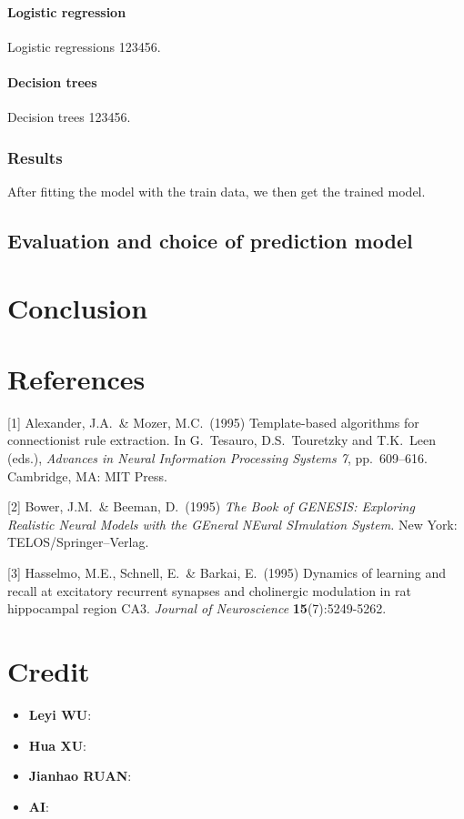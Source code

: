 \documentclass{article}
\begin{document}
\paragraph{Logistic regression} Logistic regressions 123456.

\paragraph{Decision trees} Decision trees 123456.

\subsubsection*{Results}

After fitting the model with the train data, we then get the trained model.


\subsection{Evaluation and choice of prediction model}


\section{Conclusion}
\label{conclusion}

\section*{References}
{
\small


[1] Alexander, J.A.\ \& Mozer, M.C.\ (1995) Template-based algorithms for
connectionist rule extraction. In G.\ Tesauro, D.S.\ Touretzky and T.K.\ Leen
(eds.), {\it Advances in Neural Information Processing Systems 7},
pp.\ 609--616. Cambridge, MA: MIT Press.


[2] Bower, J.M.\ \& Beeman, D.\ (1995) {\it The Book of GENESIS: Exploring
  Realistic Neural Models with the GEneral NEural SImulation System.}  New York:
TELOS/Springer--Verlag.


[3] Hasselmo, M.E., Schnell, E.\ \& Barkai, E.\ (1995) Dynamics of learning and
recall at excitatory recurrent synapses and cholinergic modulation in rat
hippocampal region CA3. {\it Journal of Neuroscience} {\bf 15}(7):5249-5262.
}

\section*{Credit}
\begin{itemize}
    \item \textbf{Leyi WU}: 
    \item \textbf{Hua XU}: 
    \item \textbf{Jianhao RUAN}:
    \item \textbf{AI}:

\end{itemize}
\end{document}
